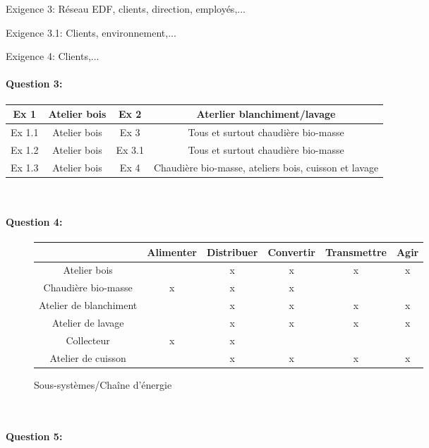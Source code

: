 Exigence 3: Réseau EDF, clients, direction, employés,...

Exigence 3.1: Clients, environnement,...

Exigence 4: Clients,...

\paragraph{Question 3:}

\begin{tabular}{|c|c|c|c|}
\hline
Ex 1 & Atelier bois & Ex 2 & Aterlier blanchiment/lavage \\
\hline
Ex 1.1 & Atelier bois & Ex 3 & Tous et surtout chaudière bio-masse \\
\hline
Ex 1.2 & Atelier bois & Ex 3.1 & Tous et surtout chaudière bio-masse \\
\hline
Ex 1.3 & Atelier bois & Ex 4 & Chaudière bio-masse, ateliers bois, cuisson et lavage \\
\hline
\end{tabular}

~\

\paragraph{Question 4:}

\begin{figure}[h!]
\begin{center}
\begin{tabular}{|c|c|c|c|c|c|}
\hline
& \textbf{Alimenter} & \textbf{Distribuer} & \textbf{Convertir} & \textbf{Transmettre} & \textbf{Agir}\\
\hline
Atelier bois & & x & x & x & x \\
\hline
Chaudière bio-masse & x & x & x & & \\
\hline
Atelier de blanchiment & & x & x & x & x \\
\hline
Atelier de lavage & & x & x & x & x \\
\hline
Collecteur & x & x & & & \\
\hline
Atelier de cuisson & & x & x & x & x \\
\hline
\end{tabular}
\end{center}
\caption{Sous-systèmes/Chaîne d'énergie}
\end{figure}

~\

\paragraph{Question 5:}


